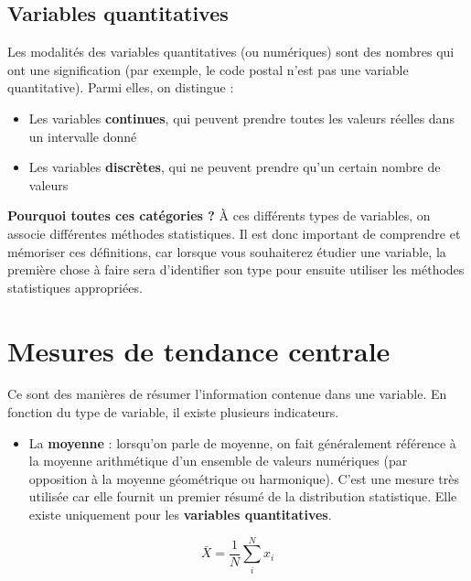 \documentclass[
]{book}
\providecommand{\tightlist}{%
  \setlength{\itemsep}{0pt}\setlength{\parskip}{0pt}}
\begin{document}
\hypertarget{variables-quantitatives}{%
\subsection{Variables quantitatives}\label{variables-quantitatives}}

Les modalités des variables quantitatives (ou numériques) sont des nombres qui ont une signification (par exemple, le code postal n'est pas une variable quantitative). Parmi elles, on distingue :

\begin{itemize}
\tightlist
\item
  Les variables \textbf{continues}, qui peuvent prendre toutes les valeurs réelles dans un intervalle donné
\item
  Les variables \textbf{discrètes}, qui ne peuvent prendre qu'un certain nombre de valeurs
\end{itemize}

\textbf{Pourquoi toutes ces catégories ?} À ces différents types de variables, on associe différentes méthodes statistiques. Il est donc important de comprendre et mémoriser ces définitions, car lorsque vous souhaiterez étudier une variable, la première chose à faire sera d'identifier son type pour ensuite utiliser les méthodes statistiques appropriées.

\hypertarget{mesures-de-tendance-centrale}{%
\section{Mesures de tendance centrale}\label{mesures-de-tendance-centrale}}

Ce sont des manières de résumer l'information contenue dans une variable. En fonction du type de variable, il existe plusieurs indicateurs.

\begin{itemize}
\tightlist
\item
  La \textbf{moyenne} : lorsqu'on parle de moyenne, on fait généralement référence à la moyenne arithmétique d'un ensemble de valeurs numériques (par opposition à la moyenne géométrique ou harmonique). C'est une mesure très utilisée car elle fournit un premier résumé de la distribution statistique. Elle existe uniquement pour les \textbf{variables quantitatives}.
\end{itemize}

\[ \bar{X} = \frac{1}{N}\sum_{i}^{N}{x_i} \]
\end{document}
